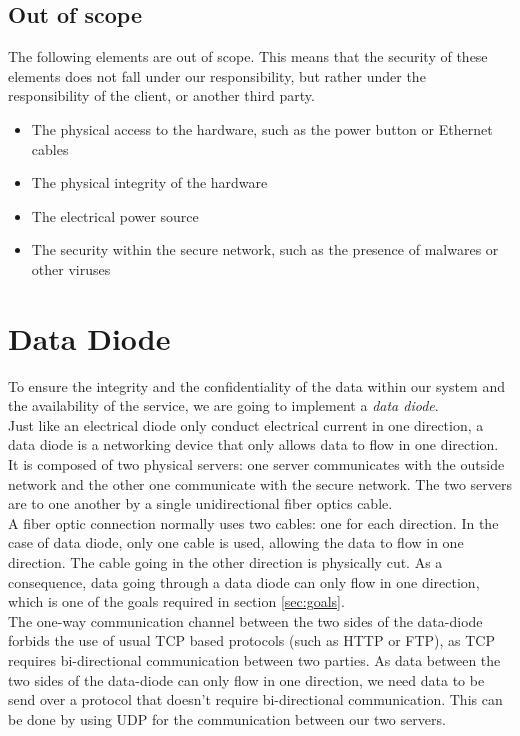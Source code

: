 \documentclass[a4paper,11pt]{article}
\begin{document}
\subsection{Out of scope}
\label{sec:outscope}
The following elements are out of scope. This means that the security of these elements does not fall under our responsibility, but rather under the responsibility of the client, or another third party.

\begin{itemize}
\item{The physical access to the hardware, such as the power button or Ethernet cables}
\item{The physical integrity of the hardware}
\item{The electrical power source}
\item{The security within the secure network, such as the presence of malwares or other viruses}
\end{itemize}


\section{Data Diode}
\label{sec:data-diode}
To ensure the integrity and the confidentiality of the data within our system and the availability of the service, we are going to implement a \textit{data diode}.\\

Just like an electrical diode only conduct electrical current in one direction, a data diode is a networking device that only allows data to flow in one direction. It is composed of two physical servers: one server communicates with the outside network and the other one communicate with the secure network. The two servers are to one another by a single unidirectional fiber optics cable.\\

A fiber optic connection normally uses two cables: one for each direction. In the case of 	 data diode, only one cable is used, allowing the data to flow in one direction. The cable going in the other direction is physically cut. As a consequence, data going through a data diode can only flow in one direction, which is one of the goals required in section \ref{sec:goals}.\\

The one-way communication channel between the two sides of the data-diode forbids the use of usual TCP based protocols (such as HTTP or FTP), as TCP requires bi-directional communication between two parties. As data between the two sides of the data-diode can only flow in one direction, we need data to be send over a protocol that doesn't require bi-directional communication. This can be done by using UDP for the communication between our two servers.\\
\end{document}
